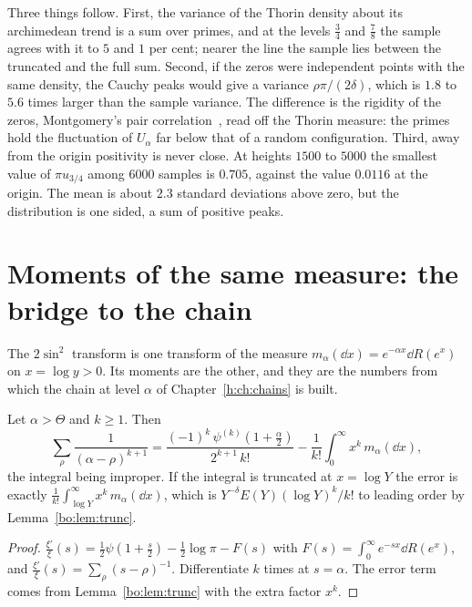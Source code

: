 Three things follow. First, the variance of the Thorin density about its archimedean trend is a sum over primes, and at the levels $\frac34$ and $\frac78$ the sample agrees with it to $5$ and $1$ per cent; nearer the line the sample lies between the truncated and the full sum. Second, if the zeros were independent points with the same density, the Cauchy peaks would give a variance $\rho\pi/(2\delta)$, which is $1.8$ to $5.6$ times larger than the sample variance. The difference is the rigidity of the zeros, Montgomery's pair correlation~\cite{Montgomery73}, read off the Thorin measure: the primes hold the fluctuation of $U_\alpha$ far below that of a random configuration. Third, away from the origin positivity is never close. At heights $1500$ to $5000$ the smallest value of $\pi u_{3/4}$ among $6000$ samples is $0.705$, against the value $0.0116$ at the origin. The mean is about $2.3$ standard deviations above zero, but the distribution is one sided, a sum of positive peaks.

\section{Moments of the same measure: the bridge to the chain}

The $2\sin^2$ transform is one transform of the measure $m_\alpha(\dd x)=e^{-\alpha x}\dd R(e^{x})$ on $x=\log y>0$. Its moments are the other, and they are the numbers from which the chain at level $\alpha$ of Chapter~\ref{h:ch:chains} is built.

\begin{proposition}\label{bo:prop:moments}
Let $\alpha>\Theta$ and $k\ge1$. Then
\[
\sum_\rho\frac{1}{(\alpha-\rho)^{k+1}}=\frac{(-1)^k\,\psi^{(k)}(1+\frac\alpha2)}{2^{k+1}\,k!}-\frac1{k!}\int_0^\infty x^k\,m_\alpha(\dd x),
\]
the integral being improper. If the integral is truncated at $x=\log Y$ the error is exactly $\frac1{k!}\int_{\log Y}^\infty x^k\,m_\alpha(\dd x)$, which is $Y^{-\delta}E(Y)(\log Y)^k/k!$ to leading order by Lemma~\ref{bo:lem:trunc}.
\end{proposition}

\begin{proof}
$\frac{\xi'}{\xi}(s)=\frac12\psi(1+\frac s2)-\frac12\log\pi-F(s)$ with $F(s)=\int_0^\infty e^{-sx}\dd R(e^x)$, and $\frac{\xi'}{\xi}(s)=\sum_\rho(s-\rho)^{-1}$. Differentiate $k$ times at $s=\alpha$. The error term comes from Lemma~\ref{bo:lem:trunc} with the extra factor $x^k$.
\end{proof}


